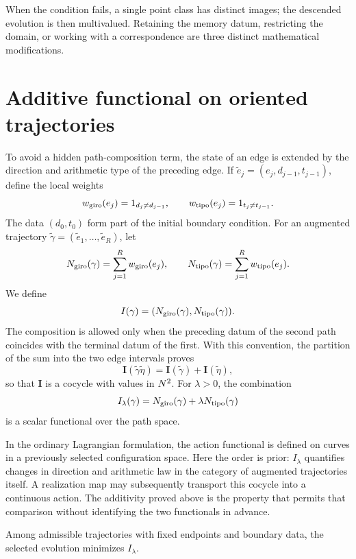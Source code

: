 When the condition fails, a single point class has distinct images;
the descended evolution is then multivalued. Retaining the memory datum,
restricting the domain, or working with a correspondence are three distinct
mathematical modifications.

\section{Additive functional on oriented trajectories}

To avoid a hidden path-composition term, the state of an edge is
extended by the direction and arithmetic type of the preceding edge. If
\(\widetilde e_j=(e_j,d_{j-1},t_{j-1})\), define the local weights
\[
 w_{\rm giro}(\widetilde e_j)=\mathbf1_{d_j\ne d_{j-1}},
 \qquad
 w_{\rm tipo}(\widetilde e_j)=\mathbf1_{t_j\ne t_{j-1}}.
\]
The data \((d_0,t_0)\) form part of the initial boundary condition.
For an augmented trajectory
\(\widetilde\gamma=(\widetilde e_1,\ldots,\widetilde e_R)\), let
\[
 N_{\rm giro}(\widetilde\gamma)=\sum_{j=1}^R
 w_{\rm giro}(\widetilde e_j),
 \qquad
 N_{\rm tipo}(\widetilde\gamma)=\sum_{j=1}^R
 w_{\rm tipo}(\widetilde e_j).
\]
We define
\[
 \mathbf I(\widetilde\gamma)=
 (N_{\rm giro}(\widetilde\gamma),N_{\rm tipo}(\widetilde\gamma)).
\]
The composition is allowed only when the preceding datum of the second path
coincides with the terminal datum of the first. With this convention, the partition
of the sum into the two edge intervals proves
\[
 \mathbf I(\widetilde\gamma\widetilde\eta)
 =\mathbf I(\widetilde\gamma)+\mathbf I(\widetilde\eta),
\]
so that \(\mathbf I\) is a cocycle with values in \(\NN^2\). For
\(\lambda>0\), the combination
\[
 I_\lambda(\widetilde\gamma)
 =N_{\rm giro}(\widetilde\gamma)
 +\lambda N_{\rm tipo}(\widetilde\gamma)
\]
is a scalar functional over the path space.

In the ordinary Lagrangian formulation, the action functional is defined
on curves in a previously selected configuration space. Here the
order is prior: \(I_\lambda\) quantifies changes in direction and arithmetic law
in the category of augmented trajectories itself. A realization map
may subsequently transport this cocycle into a continuous action. The
additivity proved above is the property that permits that
comparison without identifying the two functionals in advance.

\begin{principle}
Among admissible trajectories with fixed endpoints and boundary data, the
selected evolution minimizes \(I_\lambda\).
\end{principle}

